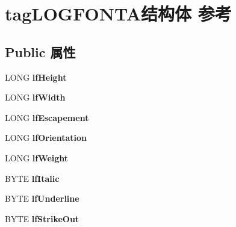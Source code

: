 \hypertarget{structtag_l_o_g_f_o_n_t_a}{}\section{tag\+L\+O\+G\+F\+O\+N\+T\+A结构体 参考}
\label{structtag_l_o_g_f_o_n_t_a}
\subsection*{Public 属性}
\begin{DoxyCompactItemize}
\item 
\mbox{\label{structtag_l_o_g_f_o_n_t_a_a85e64f1fe48a7683d20033139a94c78f}} 
L\+O\+NG {\bfseries lf\+Height}
\item 
\mbox{\label{structtag_l_o_g_f_o_n_t_a_ad9b779faf6abe15cebae5eeb4b172b2b}} 
L\+O\+NG {\bfseries lf\+Width}
\item 
\mbox{\label{structtag_l_o_g_f_o_n_t_a_abd471112e5265cbaa79bcfe1ec54be1c}} 
L\+O\+NG {\bfseries lf\+Escapement}
\item 
\mbox{\label{structtag_l_o_g_f_o_n_t_a_a1f0c8507c41b12a6497097728889a13b}} 
L\+O\+NG {\bfseries lf\+Orientation}
\item 
\mbox{\label{structtag_l_o_g_f_o_n_t_a_a340caaf99719db93b514ce4df408a77d}} 
L\+O\+NG {\bfseries lf\+Weight}
\item 
\mbox{\label{structtag_l_o_g_f_o_n_t_a_a9ff6272dec9cbd7f3ca16d921f0f1041}} 
B\+Y\+TE {\bfseries lf\+Italic}
\item 
\mbox{\label{structtag_l_o_g_f_o_n_t_a_afec960775c444b7410d17b3092dba564}} 
B\+Y\+TE {\bfseries lf\+Underline}
\item 
\mbox{\label{structtag_l_o_g_f_o_n_t_a_a7feb83de4d2006034125a24145ac106d}} 
B\+Y\+TE {\bfseries lf\+Strike\+Out}
\item 
\mbox{\label{structtag_l_o_g_f_o_n_t_a_ab2bddca4d4d8a96b7055161a5bd168d2}} 

\end{DoxyCompactItemize}
